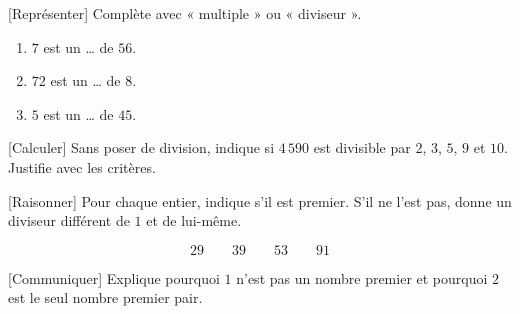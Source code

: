 \documentclass[12pt,a4paper]{article}
\begin{document}

[Représenter]
Complète avec « multiple » ou « diviseur ». 

\begin{enumerate}[label=\alph*)]
  \item \(7\) est un \ldots{} de \(56\).
  \item \(72\) est un \ldots{} de \(8\).
  \item \(5\) est un \ldots{} de \(45\).
\end{enumerate}


[Calculer]
Sans poser de division, indique si \(4\,590\) est divisible par
\(2\), \(3\), \(5\), \(9\) et \(10\).
Justifie avec les critères. 


[Raisonner]
Pour chaque entier, indique s'il est premier.
S'il ne l'est pas, donne un diviseur différent de \(1\)
et de lui-même. 

\[
29\qquad 39\qquad 53\qquad 91
\]


[Communiquer]
Explique pourquoi \(1\) n'est pas un nombre premier
et pourquoi \(2\) est le seul nombre premier pair. 

\end{document}
